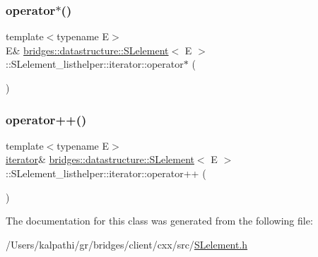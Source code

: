 \subsubsection{\texorpdfstring{operator$\ast$()}{operator*()}\hspace{0.1cm}{\footnotesize\ttfamily [2/2]}}
{\footnotesize\ttfamily template$<$typename E$>$ \\
E\& \mbox{\hyperlink{classbridges_1_1datastructure_1_1_s_lelement}{bridges\+::datastructure\+::\+S\+Lelement}}$<$ E $>$\+::S\+Lelement\+\_\+listhelper\+::iterator\+::operator$\ast$ (\begin{DoxyParamCaption}{ }\end{DoxyParamCaption})\hspace{0.3cm}{\ttfamily [inline]}}

\mbox{\label{classbridges_1_1datastructure_1_1_s_lelement_1_1_s_lelement__listhelper_1_1iterator_ab5847041e6e49fa6bcfd5efe6d2a1e1a}} 
\subsubsection{\texorpdfstring{operator++()}{operator++()}}
{\footnotesize\ttfamily template$<$typename E$>$ \\
\mbox{\hyperlink{classbridges_1_1datastructure_1_1_s_lelement_1_1_s_lelement__listhelper_1_1iterator}{iterator}}\& \mbox{\hyperlink{classbridges_1_1datastructure_1_1_s_lelement}{bridges\+::datastructure\+::\+S\+Lelement}}$<$ E $>$\+::S\+Lelement\+\_\+listhelper\+::iterator\+::operator++ (\begin{DoxyParamCaption}{ }\end{DoxyParamCaption})\hspace{0.3cm}{\ttfamily [inline]}}



The documentation for this class was generated from the following file\+:\begin{DoxyCompactItemize}
\item 
/\+Users/kalpathi/gr/bridges/client/cxx/src/\mbox{\hyperlink{_s_lelement_8h}{S\+Lelement.\+h}}\end{DoxyCompactItemize}
